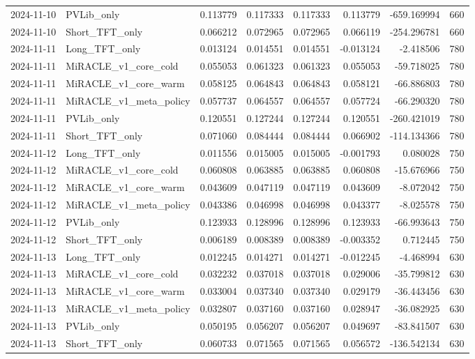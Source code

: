 \begin{tabular}{llrrrrrr}
2024-11-10 & PVLib_only & 0.113779 & 0.117333 & 0.117333 & 0.113779 & -659.169994 & 660 \\
2024-11-10 & Short_TFT_only & 0.066212 & 0.072965 & 0.072965 & 0.066119 & -254.296781 & 660 \\
2024-11-11 & Long_TFT_only & 0.013124 & 0.014551 & 0.014551 & -0.013124 & -2.418506 & 780 \\
2024-11-11 & MiRACLE_v1_core_cold & 0.055053 & 0.061323 & 0.061323 & 0.055053 & -59.718025 & 780 \\
2024-11-11 & MiRACLE_v1_core_warm & 0.058125 & 0.064843 & 0.064843 & 0.058121 & -66.886803 & 780 \\
2024-11-11 & MiRACLE_v1_meta_policy & 0.057737 & 0.064557 & 0.064557 & 0.057724 & -66.290320 & 780 \\
2024-11-11 & PVLib_only & 0.120551 & 0.127244 & 0.127244 & 0.120551 & -260.421019 & 780 \\
2024-11-11 & Short_TFT_only & 0.071060 & 0.084444 & 0.084444 & 0.066902 & -114.134366 & 780 \\
2024-11-12 & Long_TFT_only & 0.011556 & 0.015005 & 0.015005 & -0.001793 & 0.080028 & 750 \\
2024-11-12 & MiRACLE_v1_core_cold & 0.060808 & 0.063885 & 0.063885 & 0.060808 & -15.676966 & 750 \\
2024-11-12 & MiRACLE_v1_core_warm & 0.043609 & 0.047119 & 0.047119 & 0.043609 & -8.072042 & 750 \\
2024-11-12 & MiRACLE_v1_meta_policy & 0.043386 & 0.046998 & 0.046998 & 0.043377 & -8.025578 & 750 \\
2024-11-12 & PVLib_only & 0.123933 & 0.128996 & 0.128996 & 0.123933 & -66.993643 & 750 \\
2024-11-12 & Short_TFT_only & 0.006189 & 0.008389 & 0.008389 & -0.003352 & 0.712445 & 750 \\
2024-11-13 & Long_TFT_only & 0.012245 & 0.014271 & 0.014271 & -0.012245 & -4.468994 & 630 \\
2024-11-13 & MiRACLE_v1_core_cold & 0.032232 & 0.037018 & 0.037018 & 0.029006 & -35.799812 & 630 \\
2024-11-13 & MiRACLE_v1_core_warm & 0.033004 & 0.037340 & 0.037340 & 0.029179 & -36.443456 & 630 \\
2024-11-13 & MiRACLE_v1_meta_policy & 0.032807 & 0.037160 & 0.037160 & 0.028947 & -36.082925 & 630 \\
2024-11-13 & PVLib_only & 0.050195 & 0.056207 & 0.056207 & 0.049697 & -83.841507 & 630 \\
2024-11-13 & Short_TFT_only & 0.060733 & 0.071565 & 0.071565 & 0.056572 & -136.542134 & 630 \\

\end{tabular}
